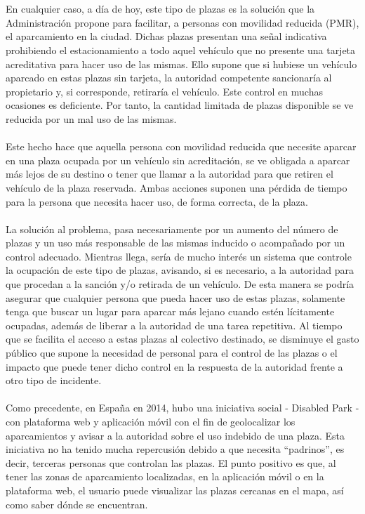 \\\\
En cualquier caso, a día de hoy, este tipo de plazas es la solución que la Administración propone para facilitar, a personas con movilidad reducida (PMR), el aparcamiento en la ciudad. Dichas plazas presentan una señal indicativa prohibiendo el estacionamiento a todo aquel vehículo que no presente una tarjeta acreditativa para hacer uso de las mismas. Ello supone que si hubiese un vehículo aparcado en estas plazas sin tarjeta, la autoridad competente sancionaría al propietario y, si corresponde, retiraría el vehículo.  Este control en muchas ocasiones es deficiente.  Por tanto, la cantidad limitada de plazas disponible se ve reducida por un mal uso de las mismas.
\\\\
Este hecho hace que aquella persona con movilidad reducida que necesite aparcar en una plaza ocupada por un vehículo sin acreditación, se ve obligada a aparcar más lejos de su destino o tener que llamar a la autoridad para que retiren el vehículo de la plaza reservada. Ambas acciones suponen una pérdida de tiempo para la persona que necesita hacer uso, de forma correcta, de la plaza.
\\\\
La solución al problema, pasa necesariamente por un aumento del número de plazas y un uso más responsable de las mismas inducido o acompañado por un control adecuado. Mientras llega, sería de mucho interés un sistema que controle la ocupación de este tipo de plazas, avisando, si es necesario, a la autoridad para que procedan a la sanción y/o retirada de un vehículo. De esta manera se podría asegurar que cualquier persona que pueda hacer uso de estas plazas, solamente tenga que buscar un lugar para aparcar más lejano cuando estén lícitamente ocupadas, además de liberar a la autoridad de una tarea repetitiva.  Al tiempo que se facilita el acceso a estas plazas al colectivo destinado, se disminuye el gasto público que supone la necesidad de personal para el control de las plazas o el impacto que puede tener dicho control en la respuesta de la autoridad frente a otro tipo de incidente. 
\\\\
Como precedente, en España en 2014, hubo una iniciativa social - Disabled Park \cite{disabledPark} - con plataforma web y aplicación móvil con el fin de geolocalizar los aparcamientos y avisar a la autoridad sobre el uso indebido de una plaza. Esta iniciativa no ha tenido mucha repercusión debido a que necesita “padrinos”, es decir, terceras personas que controlan las plazas. El punto positivo es que, al tener las zonas de aparcamiento localizadas, en la aplicación móvil o en la plataforma web, el usuario puede visualizar las plazas cercanas en el mapa, así como saber dónde se encuentran. 
